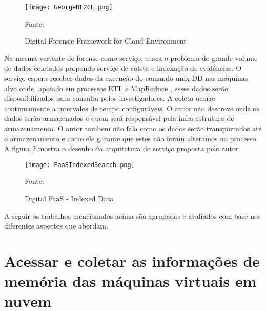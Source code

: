 \begin{figure}[htb!]
\footnotesize
\caption{Digital Forensic Framework for Cloud Environment}
\texttt{[image: GeorgeDF2CE.png]}
\centering
\label{fig:GeorgeDF2CE}
\begin{center}
Fonte: \cite{GeorgeDF2CE:2012} 
\end{center}
\end{figure}

Na mesma vertente de forense como serviço, \cite{FaaSIndexedSearch:2012} ataca o problema de grande volume de dados coletados propondo serviço de coleta e indexação de evidências.
%
O serviço espera receber dados da execução do comando unix DD \cite{UnixManPagesDD} nas máquinas alvo onde, apoiado em processos ETL e MapReduce \cite{WikipediaMapReduce}, esses dados serão disponibilizados para consulta pelos investigadores.
%
A coleta ocorre continuamente a intervalos de tempo configuráveis.
%
O autor não descreve onde os dados serão armazenados e quem será responsável pela infra-estrutura de armazenamento.
%
O autor tambem não fala como os dados serão transportados até o armazenamento e como ele garante que estes não foram alteramos no processo.
%
A figura \ref{fig:FaaSIndexedSearch} mostra o desenho da arquitetura do serviço proposta pelo autor

\begin{figure}[htb!]
\footnotesize
\caption{Digital FaaS - Indexed Data}
\texttt{[image: FaaSIndexedSearch.png]}
\centering
\label{fig:FaaSIndexedSearch}
\begin{center}
Fonte: \cite{FaaSIndexedSearch:2012} 
\end{center}
\end{figure}

A seguir os trabalhos mencionados acima são agrupados e avaliados com base nos diferentes aspectos que abordam.

\section{Acessar e coletar as informações de memória das máquinas virtuais em nuvem}
\label{sec:coletadeevidencia}

